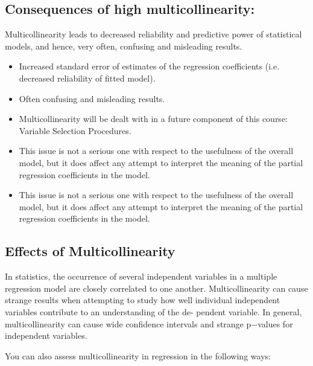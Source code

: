 \documentclass[a4paper,12pt]{article}
\begin{document}
\subsection{Consequences of high multicollinearity:}
Multicollinearity leads to decreased reliability and predictive power of statistical models, and hence, very
often, confusing and misleading results.

\begin{itemize}
	\item Increased standard error of estimates of the regression coefficients (i.e. decreased reliability of fitted
	model).
	\item Often confusing and misleading results.
	\item Multicollinearity will be dealt with in a future component of this course: Variable Selection Procedures.
	\item This issue is not a serious one with respect to the
	usefulness of the overall model, but it does affect any attempt to interpret the meaning of the partial regression
	coefficients in the model.
	\item  This issue is not a serious one with respect to the usefulness of the overall model, but it does affect any attempt to interpret the meaning of the partial regression coefficients in the model.

\end{itemize}

\subsection{Effects of Multicollinearity}

In statistics, the occurrence of several independent variables in a multiple regression model are
closely correlated to one another. Multicollinearity can cause strange results when attempting
to study how well individual independent variables contribute to an understanding of the de-
pendent variable. In general, multicollinearity can cause wide confidence intervals and strange
p−values for independent variables.

\bigskip

You can also assess multicollinearity in regression in the following ways:
\end{document}
